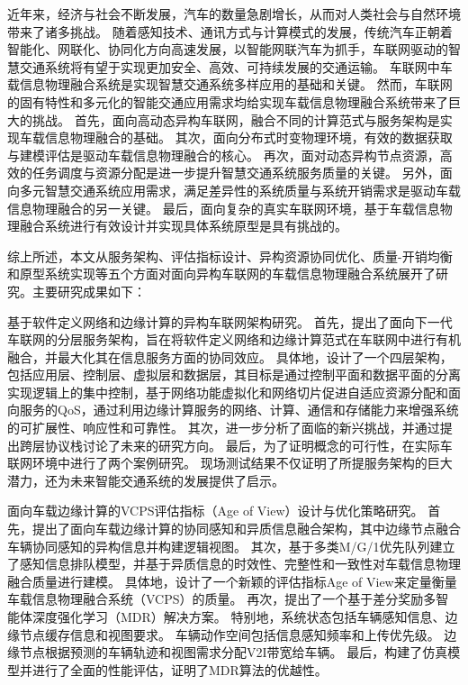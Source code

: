 \begin{cabstract}	%

近年来，经济与社会不断发展，汽车的数量急剧增长，从而对人类社会与自然环境带来了诸多挑战。
随着感知技术、通讯方式与计算模式的发展，传统汽车正朝着智能化、网联化、协同化方向高速发展，以智能网联汽车为抓手，车联网驱动的智慧交通系统将有望于实现更加安全、高效、可持续发展的交通运输。
车联网中车载信息物理融合系统是实现智慧交通系统多样应用的基础和关键。
然而，车联网的固有特性和多元化的智能交通应用需求均给实现车载信息物理融合系统带来了巨大的挑战。
首先，面向高动态异构车联网，融合不同的计算范式与服务架构是实现车载信息物理融合的基础。
其次，面向分布式时变物理环境，有效的数据获取与建模评估是驱动车载信息物理融合的核心。
再次，面对动态异构节点资源，高效的任务调度与资源分配是进一步提升智慧交通系统服务质量的关键。
另外，面向多元智慧交通系统应用需求，满足差异性的系统质量与系统开销需求是驱动车载信息物理融合的另一关键。
最后，面向复杂的真实车联网环境，基于车载信息物理融合系统进行有效设计并实现具体系统原型是具有挑战的。

综上所述，本文从服务架构、评估指标设计、异构资源协同优化、质量-开销均衡和原型系统实现等五个方面对面向异构车联网的车载信息物理融合系统展开了研究。主要研究成果如下：

 基于软件定义网络和边缘计算的异构车联网架构研究。
首先，提出了面向下一代车联网的分层服务架构，旨在将软件定义网络和边缘计算范式在车联网中进行有机融合，并最大化其在信息服务方面的协同效应。
具体地，设计了一个四层架构，包括应用层、控制层、虚拟层和数据层，其目标是通过控制平面和数据平面的分离实现逻辑上的集中控制，基于网络功能虚拟化和网络切片促进自适应资源分配和面向服务的QoS，通过利用边缘计算服务的网络、计算、通信和存储能力来增强系统的可扩展性、响应性和可靠性。
其次，进一步分析了面临的新兴挑战，并通过提出跨层协议栈讨论了未来的研究方向。
最后，为了证明概念的可行性，在实际车联网环境中进行了两个案例研究。
现场测试结果不仅证明了所提服务架构的巨大潜力，还为未来智能交通系统的发展提供了启示。

 面向车载边缘计算的VCPS评估指标（Age of View）设计与优化策略研究。
首先，提出了面向车载边缘计算的协同感知和异质信息融合架构，其中边缘节点融合车辆协同感知的异构信息并构建逻辑视图。
其次，基于多类M/G/1优先队列建立了感知信息排队模型，并基于异质信息的时效性、完整性和一致性对车载信息物理融合质量进行建模。
具体地，设计了一个新颖的评估指标Age of View来定量衡量车载信息物理融合系统（VCPS）的质量。
再次，提出了一个基于差分奖励多智能体深度强化学习（MDR）解决方案。
特别地，系统状态包括车辆感知信息、边缘节点缓存信息和视图要求。
车辆动作空间包括信息感知频率和上传优先级。
边缘节点根据预测的车辆轨迹和视图需求分配V2I带宽给车辆。
最后，构建了仿真模型并进行了全面的性能评估，证明了MDR算法的优越性。


\end{cabstract}
